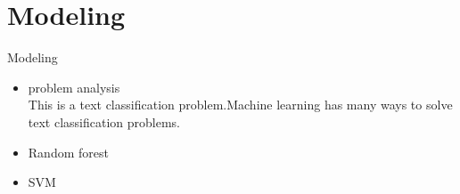 \documentclass[
 size=12pt,
 paper=smartboard, %
 mode=present, %
 display=slides, %
style=tuliplab,
pauseslide,
fleqn,leqno]{powerdot}
\begin{document}


\section{Modeling}

\begin{slide}[toc=,bm=]{Modeling}
\begin{itemize}
  \item problem analysis\\
\vspace{0.5cm}This is a text classification problem.Machine learning has many ways to solve text classification problems.
\vspace{1cm}
  \item  Random forest
\vspace{1CM}
  \item  SVM
\end{itemize}
\end{slide}
\end{document}
